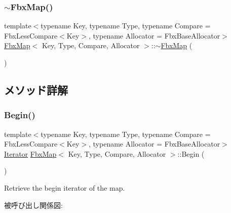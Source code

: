\mbox{\label{class_fbx_map_ac0883128b3b0a4c25e55d153841d2a01}} 
\subsubsection{\texorpdfstring{$\sim$\+Fbx\+Map()}{~FbxMap()}}
{\footnotesize\ttfamily template$<$typename Key, typename Type, typename Compare = Fbx\+Less\+Compare$<$\+Key$>$, typename Allocator = Fbx\+Base\+Allocator$>$ \\
\hyperlink{class_fbx_map}{Fbx\+Map}$<$ Key, Type, Compare, Allocator $>$\+::$\sim$\hyperlink{class_fbx_map}{Fbx\+Map} (\begin{DoxyParamCaption}{ }\end{DoxyParamCaption})}



\subsection{メソッド詳解}
\mbox{\label{class_fbx_map_ae4c5e09fb73bde49ef7f53ab0ad11fbd}} 
\subsubsection{\texorpdfstring{Begin()}{Begin()}\hspace{0.1cm}{\footnotesize\ttfamily [1/2]}}
{\footnotesize\ttfamily template$<$typename Key, typename Type, typename Compare = Fbx\+Less\+Compare$<$\+Key$>$, typename Allocator = Fbx\+Base\+Allocator$>$ \\
\hyperlink{class_fbx_map_ab0989f3b30c0c8652ff9ee1b28b5c1af}{Iterator} \hyperlink{class_fbx_map}{Fbx\+Map}$<$ Key, Type, Compare, Allocator $>$\+::Begin (\begin{DoxyParamCaption}{ }\end{DoxyParamCaption})}



Retrieve the begin iterator of the map. 

被呼び出し関係図\+:
\mbox{\label{class_fbx_map_af6956e55ea4b46656a9a357935d74b96}} 
